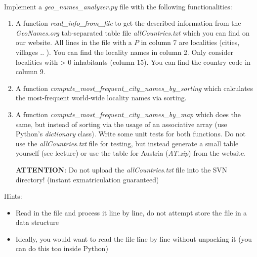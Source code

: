  \\
Implement a \textit{geo\_names\_analyzer.py} file with the following functionalities:
\begin{enumerate}
  \item
    A function \textit{read\_info\_from\_file} to get the described information from
    the \textit{GeoNames.org} tab-separated table file \textit{allCountries.txt}
    which you can find on our website.
    All lines in the file with a $P$ in column 7 are localities (cities, villages .. ).
    You can find the locality names in column 2.
    Only consider localities with > 0 inhabitants (column 15).
    You can find the country code in column 9.
  \item
    A function \textit{compute\_most\_frequent\_city\_names\_by\_sorting} which
    calculates the most-frequent world-wide locality names via sorting.
  \item
    A function \textit{compute\_most\_frequent\_city\_names\_by\_map} which does the
    same, but instead of sorting via the usage of an associative array (use Python's \textit{dictionary} class).
    Write some unit tests for both functions.
    Do not use the \textit{allCountries.txt} file for testing,
    but instead generate a small table yourself (see lecture) or use the table for Austria (\textit{AT.zip}) 
    from the website.
    
    \textbf{ATTENTION}: Do not upload the \textit{allCountries.txt} file into
    the SVN directory! (instant exmatriculation guaranteed)
\end{enumerate}

Hints:
\begin{itemize}
\item Read in the file and process it line by line, do not attempt store the file in a data structure
\item Ideally, you would want to read the file line by line without unpacking it (you can do this too inside Python)
\end{itemize}

